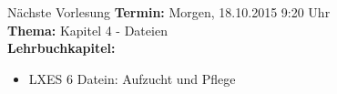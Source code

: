 \documentclass[aspectratio=43]{beamer}
\begin{document}
\begin{frame}[plain]
\begin{alertblock}{Nächste Vorlesung}
\textbf{Termin:} Morgen, 18.10.2015 9:20 Uhr\\
\textbf{Thema:} Kapitel 4 - Dateien \\
\textbf{Lehrbuchkapitel:} 
\begin{itemize}
\item LXES 6 Datein: Aufzucht und Pflege
\end{itemize}
\end{alertblock}
\end{frame}

\materialframe
\versionframe
\end{document}
